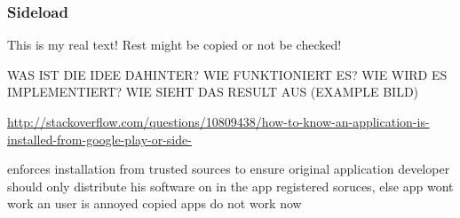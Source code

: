 \subsubsection{Sideload} \label{subsection:counter-improve-tampering-sideload}
This is my real text! Rest might be copied or not be checked!

WAS IST DIE IDEE DAHINTER? WIE FUNKTIONIERT ES? WIE WIRD ES IMPLEMENTIERT? WIE SIEHT DAS RESULT AUS (EXAMPLE BILD)\newline

\url{http://stackoverflow.com/questions/10809438/how-to-know-an-application-is-installed-from-google-play-or-side-}

enforces installation from trusted sources to ensure original application
developer should only distribute his software on in the app registered soruces, else app wont work an user is annoyed
copied apps do not work now

